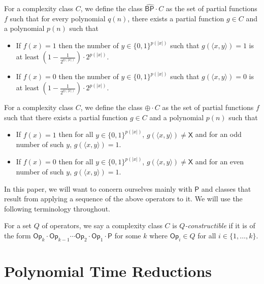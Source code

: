 \documentclass[11pt]{article}
\newcommand{\strongbp}{\widehat{\textsf{BP}}}
\newcommand{\parity}{\oplus}
\newcommand{\p}{\textsf{P}}
\newcommand{\op}{\textsf{Op}}
\newcommand{\x}{\textsf{X}}
\begin{document}
\begin{definition}\label{opstrongbp}
For a complexity class $C$, we define the class $\strongbp\cdot C$ as the set of partial functions $f$ such that for every polynomial $q(n)$, there exists a partial function $g \in C$ and a polynomial $p(n)$ such that
\begin{itemize}
\item If $f(x) = 1$ then the number of $y \in \{0,1\}^{p(|x|)}$ such that $g(\langle x, y \rangle) = 1$ is at least \linebreak$\left(1 - \frac{1}{2^{q(|x|)}}\right)\cdot 2^{p(|x|)}$.
\item If $f(x) = 0$ then the number of $y \in \{0,1\}^{p(|x|)}$ such that $g(\langle x, y \rangle) = 0$ is at least \linebreak$\left(1 - \frac{1}{2^{q(|x|)}}\right)\cdot 2^{p(|x|)}$.
\end{itemize}
\end{definition}

\begin{definition}\label{opparity}
For a complexity class $C$, we define the class $\parity\cdot C$ as the set of partial functions $f$ such that there exists a partial function $g \in C$ and a polynomial $p(n)$ such that
\begin{itemize}
\item If $f(x) = 1$ then for all $y \in \{0,1\}^{p(|x|)}$, $g(\langle x, y\rangle) \neq \x$ and for an odd number of such $y$, $g(\langle x,y\rangle) = 1$.
\item If $f(x) = 0$ then for all $y \in \{0,1\}^{p(|x|)}$, $g(\langle x, y\rangle) \neq \x$ and for an even number of such $y$, $g(\langle x,y\rangle) = 1$.
\end{itemize}
\end{definition}

In this paper, we will want to concern ourselves mainly with $\p$ and classes that result from applying a sequence of the above operators to it. We will use the following terminology throughout.
\begin{definition}\label{constructible}
For a set $Q$ of operators, we say a complexity class $C$ is \emph{$Q$-constructible} if it is of the form $\op_k \cdot\op_{k-1} \cdots \op_{2} \cdot \op_1 \cdot \p$ for some $k$ where $\op_i \in Q$ for all $i \in \{1,\ldots,k\}$.
\end{definition}

\section{Polynomial Time Reductions}
\end{document}
